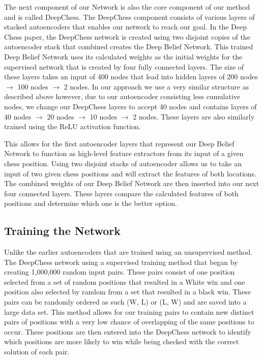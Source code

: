 \documentclass[12pt]{article}
\begin{document}
    The next component of our Network is also the core component of our method and is called DeepChess. The DeepChess component consists of various layers of stacked autoencoders that enables our network to reach our goal. In the Deep Chess paper, the DeepChess network is created using two disjoint copies of the autoencoder stack that combined creates the Deep Belief Network. This trained Deep Belief Network uses its calculated weights as the initial weights for the supervised network that is created by four fully connected layers. The size of these layers takes an input of 400 nodes that lead into hidden layers of 200 nodes $\rightarrow$ 100 nodes $\rightarrow$ 2 nodes. In our approach we use a very similar structure as described above however, due to our autoencoder consisting less cumulative nodes, we change our DeepChess layers to accept 40 nodes and contains layers of 40 nodes $\rightarrow$ 20 nodes $\rightarrow$ 10 nodes $\rightarrow$ 2 nodes. These layers are also similarly trained using the ReLU activation function.

    This allows for the first autoencoder layers that represent our Deep Belief Network to function as high-level feature extractors from its input of a given chess position. Using two disjoint stacks of autoencoder allows us to take an input of two given chess positions and will extract the features of both locations. The combined weights of our Deep Belief Network are then inserted into our next four connected layers. These layers compare the calculated features of both positions and determine which one is the better option. 

    \subsection{Training the Network}

    Unlike the earlier autoencoders that are trained using an unsupervised method. The DeepChess network using a supervised training method that began by creating 1,000,000 random input pairs. These pairs consist of one position selected from a set of random positions that resulted in a White win and one position also selected by random from a set that resulted in a black win. These pairs can be randomly ordered as such (W, L) or (L, W) and are saved into a large data set. This method allows for our training pairs to contain new distinct pairs of positions with a very low chance of overlapping of the same positions to occur. These positions are then entered into the DeepChess network to identify which positions are more likely to win while being checked with the correct solution of each pair.  
\end{document}
